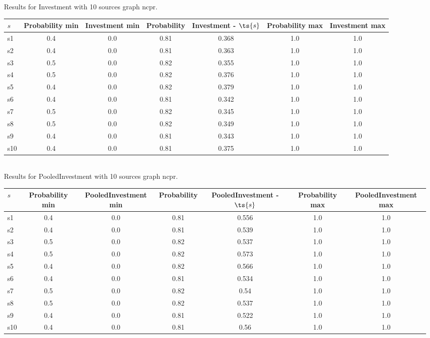 \documentclass{article}
\begin{document}
\noindent Results for Investment with 10 sources graph ncpr.

\noindent\begin{tabular}{|l|c|c|c|c|c|c|}
\hline
$s$& Probability min & Investment min & Probability & Investment - $\ts{s}$ & Probability max & Investment max\\
\hline
s1 &0.4 & 0.0 & 0.81 & 0.368 & 1.0 & 1.0\\
\hline
s2 &0.4 & 0.0 & 0.81 & 0.363 & 1.0 & 1.0\\
\hline
s3 &0.5 & 0.0 & 0.82 & 0.355 & 1.0 & 1.0\\
\hline
s4 &0.5 & 0.0 & 0.82 & 0.376 & 1.0 & 1.0\\
\hline
s5 &0.4 & 0.0 & 0.82 & 0.379 & 1.0 & 1.0\\
\hline
s6 &0.4 & 0.0 & 0.81 & 0.342 & 1.0 & 1.0\\
\hline
s7 &0.5 & 0.0 & 0.82 & 0.345 & 1.0 & 1.0\\
\hline
s8 &0.5 & 0.0 & 0.82 & 0.349 & 1.0 & 1.0\\
\hline
s9 &0.4 & 0.0 & 0.81 & 0.343 & 1.0 & 1.0\\
\hline
s10 &0.4 & 0.0 & 0.81 & 0.375 & 1.0 & 1.0\\
\hline
\end{tabular}\\

\noindent Results for PooledInvestment with 10 sources graph ncpr.

\noindent\begin{tabular}{|l|c|c|c|c|c|c|}
\hline
$s$& Probability min & PooledInvestment min & Probability & PooledInvestment - $\ts{s}$ & Probability max & PooledInvestment max\\
\hline
s1 &0.4 & 0.0 & 0.81 & 0.556 & 1.0 & 1.0\\
\hline
s2 &0.4 & 0.0 & 0.81 & 0.539 & 1.0 & 1.0\\
\hline
s3 &0.5 & 0.0 & 0.82 & 0.537 & 1.0 & 1.0\\
\hline
s4 &0.5 & 0.0 & 0.82 & 0.573 & 1.0 & 1.0\\
\hline
s5 &0.4 & 0.0 & 0.82 & 0.566 & 1.0 & 1.0\\
\hline
s6 &0.4 & 0.0 & 0.81 & 0.534 & 1.0 & 1.0\\
\hline
s7 &0.5 & 0.0 & 0.82 & 0.54 & 1.0 & 1.0\\
\hline
s8 &0.5 & 0.0 & 0.82 & 0.537 & 1.0 & 1.0\\
\hline
s9 &0.4 & 0.0 & 0.81 & 0.522 & 1.0 & 1.0\\
\hline
s10 &0.4 & 0.0 & 0.81 & 0.56 & 1.0 & 1.0\\
\hline
\end{tabular}\\
\end{document}
